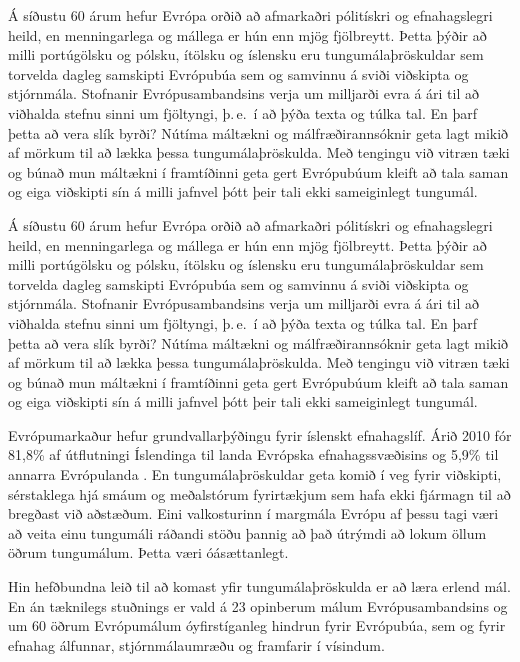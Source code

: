 \documentclass{../../metanetpaper}
\begin{document}
\begin{multicols}{2}
Á síðustu 60 árum hefur Evrópa orðið að afmarkaðri pólitískri og efnahagslegri heild, en menningarlega og mállega er hún enn mjög fjölbreytt. Þetta þýðir að milli portúgölsku og pólsku, ítölsku og íslensku eru tungumálaþröskuldar sem torvelda dagleg samskipti Evrópubúa sem og samvinnu á sviði viðskipta og stjórnmála. Stofnanir Evrópusambandsins verja um milljarði evra á ári til að viðhalda stefnu sinni um fjöltyngi, þ.\,e.~í að þýða texta og túlka tal. En þarf þetta að vera slík byrði? Nútíma máltækni og málfræðirannsóknir geta lagt mikið af mörkum til að lækka þessa tungumálaþröskulda. Með tengingu við vitræn tæki og búnað mun máltækni í framtíðinni geta gert Evrópubúum kleift að tala saman og eiga viðskipti sín á milli jafnvel þótt þeir tali ekki sameiginlegt tungumál.


Á síðustu 60 árum hefur Evrópa orðið að afmarkaðri pólitískri og efnahagslegri heild, en menningarlega og mállega er hún enn mjög fjölbreytt. Þetta þýðir að milli portúgölsku og pólsku, ítölsku og íslensku eru tungumálaþröskuldar sem torvelda dagleg samskipti Evrópubúa sem og samvinnu á sviði viðskipta og stjórnmála. Stofnanir Evrópusambandsins verja um milljarði evra á ári til að viðhalda stefnu sinni um fjöltyngi, þ.\,e.~í að þýða texta og túlka tal. En þarf þetta að vera slík byrði? Nútíma máltækni og málfræðirannsóknir geta lagt mikið af mörkum til að lækka þessa tungumálaþröskulda. Með tengingu við vitræn tæki og búnað mun máltækni í framtíðinni geta gert Evrópubúum kleift að tala saman og eiga viðskipti sín á milli jafnvel þótt þeir tali ekki sameiginlegt tungumál.

Evrópumarkaður hefur grundvallarþýðingu fyrir íslenskt efnahagslíf. Árið 2010 fór 81,8\% af útflutningi Íslendinga til landa Evrópska efnahagssvæðisins og 5,9\% til annarra Evrópulanda \cite{hag3}. En tungumálaþröskuldar geta komið í veg fyrir viðskipti, sérstaklega hjá smáum og meðalstórum fyrirtækjum sem hafa ekki fjármagn til að bregðast við aðstæðum. Eini valkosturinn í margmála Evrópu af þessu tagi væri að veita einu tungumáli ráðandi stöðu þannig að það útrýmdi að lokum öllum öðrum tungumálum. Þetta væri óásættanlegt.

Hin hefðbundna leið til að komast yfir tungumálaþröskulda er að læra erlend mál. En án tæknilegs stuðnings er vald á 23 opinberum málum Evrópusambandsins og um 60 öðrum Evrópumálum óyfirstíganleg hindrun fyrir Evrópubúa, sem og fyrir efnahag álfunnar, stjórnmálaumræðu og framfarir í vísindum.


\end{multicols}
\end{document}
